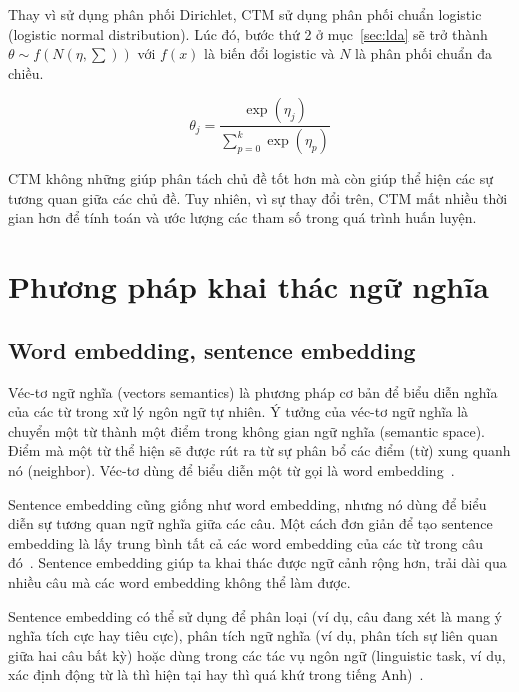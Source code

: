 Thay vì sử dụng phân phối Dirichlet, CTM sử dụng phân phối chuẩn logistic (logistic normal distribution). Lúc đó, bước thứ 2 ở mục~\ref{sec:lda} sẽ trở thành $\theta \sim f(N(\eta, \sum))$ với $f(x)$ là biến đổi logistic và $N$ là phân phối chuẩn đa chiều.

\[
\theta_{j}=\frac{\exp \left(\eta_{j}\right)}{\sum_{p=0}^{k} \exp
\left(\eta_{p}\right)}
\]

CTM không những giúp phân tách chủ đề tốt hơn mà còn giúp thể hiện các sự tương quan giữa các chủ đề. Tuy nhiên, vì sự thay đổi trên, CTM mất nhiều thời gian hơn để tính toán và ước lượng các tham số trong quá trình huấn luyện.

\section{Phương pháp khai thác ngữ nghĩa}
\subsection{Word embedding, sentence embedding}
Véc-tơ ngữ nghĩa (vectors semantics) là phương pháp cơ bản để biểu diễn nghĩa của các từ trong xử lý ngôn ngữ tự nhiên. Ý tưởng của véc-tơ ngữ nghĩa là chuyển một từ thành một điểm trong không gian ngữ nghĩa (semantic space). Điểm mà một từ thể hiện sẽ được rút ra từ sự phân bổ các điểm (từ) xung quanh nó (neighbor). Véc-tơ dùng để biểu diễn một từ gọi là word embedding~\cite{jurafskySpeechLanguageProcessing}.


Sentence embedding cũng giống như word embedding, nhưng nó dùng để biểu diễn sự tương quan ngữ nghĩa giữa các câu. Một cách đơn giản để tạo sentence embedding là lấy trung bình tất cả các word embedding của các từ trong câu đó~\cite{lamGomCumVan2021}. Sentence embedding giúp ta khai thác được ngữ cảnh rộng hơn, trải dài qua nhiều câu mà các word embedding không thể làm được.

Sentence embedding có thể sử dụng để phân loại (ví dụ, câu đang xét là mang ý nghĩa tích cực hay tiêu cực), phân tích ngữ nghĩa (ví dụ, phân tích sự liên quan giữa hai câu bất kỳ) hoặc dùng trong các tác vụ ngôn ngữ (linguistic task, ví dụ, xác định động từ là thì hiện tại hay thì quá khứ trong tiếng Anh)~\cite{heidenreichPaperSummaryEvaluation2018}.

